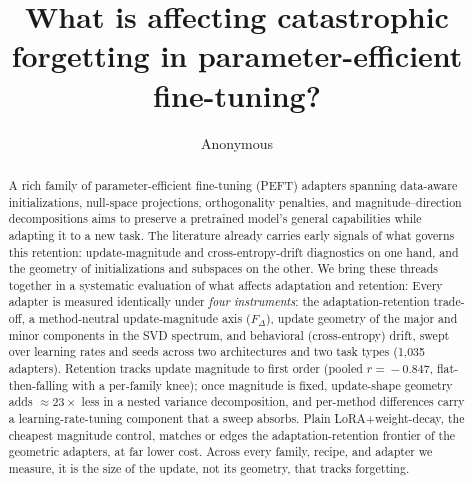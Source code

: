 \documentclass[11pt]{article}
\title{What is affecting catastrophic forgetting in parameter-efficient fine-tuning?}
\author{Anonymous}
\newcommand{\dw}{F_{\Delta}}
\begin{document}
\maketitle

\begin{abstract}
A rich family of parameter-efficient fine-tuning (PEFT) adapters spanning
data-aware initializations, null-space projections, orthogonality penalties, and
magnitude--direction decompositions aims to preserve a pretrained model's
general capabilities while adapting it to a new task. The literature already
carries early signals of what governs this retention: update-magnitude and
cross-entropy-drift diagnostics on one hand, and the geometry of initializations
and subspaces on the other. We bring these threads together in a systematic
evaluation of what affects adaptation and retention: Every adapter is measured
identically under \emph{four instruments}: the adaptation-retention trade-off,
a method-neutral update-magnitude axis ($\dw$), update geometry of the major and minor components in the SVD spectrum, and behavioral
(cross-entropy) drift, swept over learning rates and seeds across two
architectures and two task types (1{,}035 adapters). Retention tracks update
magnitude to first order (pooled $r\!=\!-0.847$, flat-then-falling with a
per-family knee); once magnitude is fixed, update-shape geometry adds
$\approx\!23\times$ less in a nested variance decomposition, and per-method
differences carry a learning-rate-tuning component that a sweep absorbs. Plain
LoRA{+}weight-decay, the cheapest magnitude control, matches or edges the
adaptation-retention frontier of the geometric adapters, at far lower cost.
Across every family, recipe, and adapter we measure, it is the size of the
update, not its geometry, that tracks forgetting.
\end{abstract}

\end{document}

